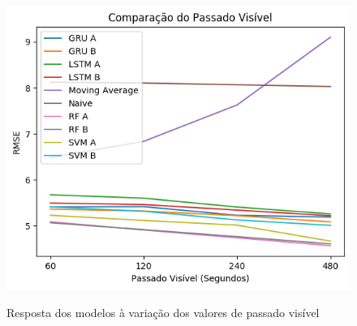 \begin{figure}[htbp]
    \centering
    \includegraphics[scale=0.9]{monography/img/comparisons/comparacao_do_passado_visivel_rmse.png}
    \label{figure:res_past}
    \caption[Resposta dos modelos à variação dos valores de passado visível]{Resposta dos modelos à variação dos valores de passado visível}
\end{figure}

